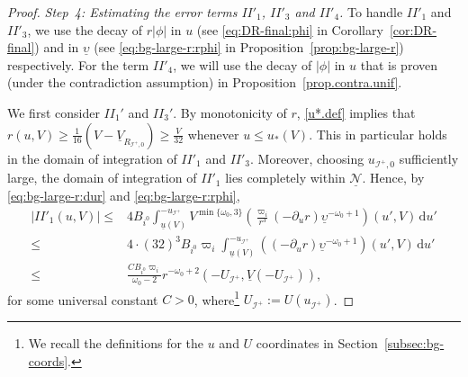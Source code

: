 \documentclass[10pt, reqno]{amsart}
\theoremstyle{definition}
\theoremstyle{remark}
\theoremstyle{conjecture}
\numberwithin{equation}{section}
\newcommand{\ud}{\mathrm{d}}
\newcommand{\rd}{\partial}
\newcommand{\0}{\emptyset}
\newcommand{\omg}{\omega}
\newcommand{\ups}{\upsilon}
\newcommand{\calI}{\mathcal I}
\newcommand{\f}{\frac}
\newcommand{\pfstep}[1]{\vspace{.5em} {\it \noindent #1.}}
\newcommand{\NI}{\calI^{+}}						%
\newcommand{\Vb}{\underline{V}}
\begin{document}
\begin{proof}
\pfstep{Step~4: Estimating the error terms $II'_1$, $II'_3$ and $II'_4$} To handle $II'_1$ and $II'_3$, we use the decay of $r|\phi|$ in $u$ (see \eqref{eq:DR-final:phi} in Corollary~\ref{cor:DR-final}) and in $\underline{\ups}$ (see \eqref{eq:bg-large-r:rphi} in Proposition~\ref{prop:bg-large-r}) respectively. For the term $II'_4$, we will use the decay of $|\phi|$ in $u$ that is proven (under the contradiction assumption) in Proposition~\ref{prop.contra.unif}. 

We first consider $II_1'$ and $II_3'$. By monotonicity of $r$, \eqref{u*.def} implies that $r(u,V)\geq \f{1}{16} (V - \Vb_{R_{\NI,0}}) \geq \frac{V}{32}$ whenever $u\leq u_*(V)$. This in particular holds in the domain of integration of $II'_1$ and $II'_3$. Moreover, choosing $u_{\calI^+,0}$ sufficiently large, the domain of integration of $II'_1$ lies completely within $\underline{\mathcal N}$. Hence, by \eqref{eq:bg-large-r:dur} and \eqref{eq:bg-large-r:rphi},
\begin{equation}\label{IIp1.est}
\begin{split}
|II'_1(u,V)|\leq &4 B_{i^0} \int_{\underline{u}(V)}^{-u_{\calI^+}} V^{\min\{\omg_0,3\}}\left(\frac{\varpi_{i}}{r^{3}}(-\rd_{u} r)\underline\ups^{-\omg_0+1}\right)(u',V)  \, \ud u'\\
\leq &4\cdot (32)^3 B_{i^0} \varpi_{i}\int_{\underline{u}(V)}^{-u_{\calI^+}} \left((-\rd_{u} r)\underline\ups^{-\omg_0+1}\right)(u',V)  \, \ud u'\\
\leq & \f{C B_{i^0} \varpi_{i} }{\omg_0-2} r^{-\omg_0+2}(-U_{\calI^+}, \underline{V}(-U_{\calI^+})),
\end{split}
\end{equation}
for some universal constant $C>0$, where\footnote{We recall the definitions for the $u$ and $U$ coordinates in Section~\ref{subsec:bg-coords}.} $U_{\calI^+}:=U(u_{\calI^+})$.


\end{proof}
\end{document}
